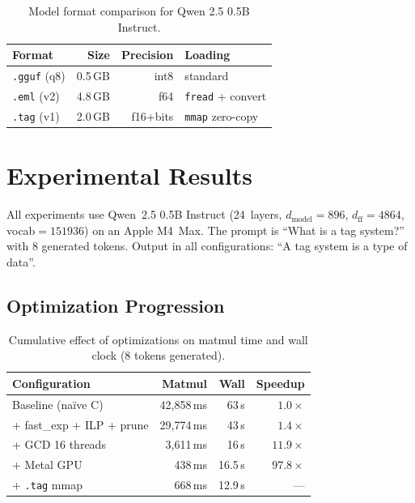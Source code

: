 \documentclass[acmsmall,nonacm]{acmart}
\begin{document}
\begin{table}[h]
\centering
\caption{Model format comparison for Qwen 2.5 0.5B Instruct.}
\label{tab:format}
\begin{tabular}{lrrl}
\toprule
\textbf{Format} & \textbf{Size} & \textbf{Precision} & \textbf{Loading} \\
\midrule
\texttt{.gguf} (q8) & 0.5\,GB & int8 & standard \\
\texttt{.eml} (v2)  & 4.8\,GB & f64  & \texttt{fread} + convert \\
\texttt{.tag} (v1)  & 2.0\,GB & f16+bits & \texttt{mmap} zero-copy \\
\bottomrule
\end{tabular}
\end{table}


\section{Experimental Results}
\label{sec:results}

All experiments use Qwen~2.5 0.5B Instruct (24~layers,
$d_\text{model}=896$, $d_\text{ff}=4864$, vocab$=151936$) on an
Apple M4~Max.  The prompt is ``What is a tag system?'' with 8
generated tokens.  Output in all configurations: ``A tag system
is a type of data''.

\subsection{Optimization Progression}

\begin{table}[h]
\centering
\caption{Cumulative effect of optimizations on matmul time and wall
  clock (8 tokens generated).}
\label{tab:optim}
\begin{tabular}{lrrr}
\toprule
\textbf{Configuration} & \textbf{Matmul} & \textbf{Wall} & \textbf{Speedup} \\
\midrule
Baseline (na\"ive C)      & 42,858\,ms & 63\,s   & $1.0\times$ \\
+ fast\_exp + ILP + prune  & 29,774\,ms & 43\,s   & $1.4\times$ \\
+ GCD 16 threads           &  3,611\,ms & 16\,s   & $11.9\times$ \\
+ Metal GPU                &    438\,ms & 16.5\,s & $97.8\times$ \\
+ \texttt{.tag} mmap       &    668\,ms & 12.9\,s & --- \\
\bottomrule
\end{tabular}
\end{table}
\end{document}
